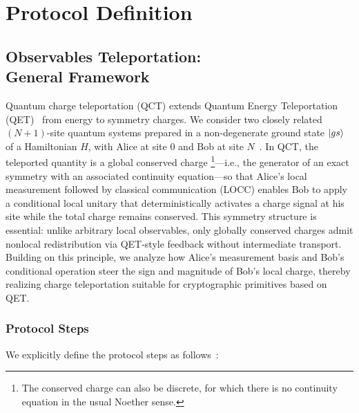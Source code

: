 \section{Protocol Definition}
\label{sec:protocol}

\subsection{Observables Teleportation:\texorpdfstring{\\}{line}General Framework}
\label{sec:generic_teleportation}

Quantum charge teleportation (QCT) extends Quantum Energy Teleportation (QET)~\cite{Hotta2011,Ikeda2023} from energy to symmetry charges. We consider two closely related $(N\!+\!1)$-site quantum systems prepared in a non-degenerate ground state $\ket{gs}$ of a Hamiltonian $H$, with Alice at site $0$ and Bob at site $N$~\cite{QKDbyQET,IkedaTeleportingCharge}. In QCT, the teleported quantity is a global conserved charge \footnote{The conserved charge can also be discrete, for which there is no continuity equation in the usual Noether sense.}—i.e., the generator of an exact symmetry with an associated continuity equation—so that Alice’s local measurement followed by classical communication (LOCC) enables Bob to apply a conditional local unitary that deterministically activates a charge signal at his site while the total charge remains conserved. This symmetry structure is essential: unlike arbitrary local observables, only globally conserved charges admit nonlocal redistribution via QET-style feedback without intermediate transport. Building on this principle, we analyze how Alice’s measurement basis and Bob’s conditional operation steer the sign and magnitude of Bob’s local charge, thereby realizing charge teleportation suitable for cryptographic primitives based on QET.

\subsubsection{Protocol Steps}
We explicitly define the protocol steps as follows~\cite{QKDbyQET}:


